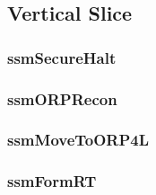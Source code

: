 \documentclass[../../main/main.tex]{subfiles}
\begin{document}
\subsection{Vertical Slice}\label{ssec:verticalslice}

\subsubsection{ssmSecureHalt}\label{sssec:ssmSecureHalt}

\subsubsection{ssmORPRecon}\label{sssec:ssmORPRecon}

\subsubsection{ssmMoveToORP4L}\label{sssec:ssmMoveToORP4L}

\subsubsection{ssmFormRT}\label{sssec:ssmFormRT}
\end{document}
